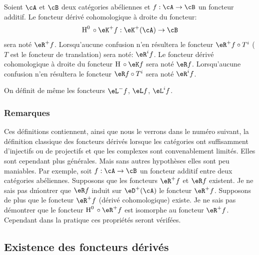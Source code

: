 Soient $\cA$ et $\cB$ deux catégories abéliennes et $f:\cA\to \cB$ un 
foncteur additif. Le foncteur dérivé cohomologique à droite du foncteur: 
\[
  \h^0{}\circ \eK^+ f:\eK^+(\cA) \to \cB 
\]
sera noté $\eR^+ f$. Lorsqu'aucune confusion n'en résultera le foncteur 
$\eR^+ f\circ T^i$ ($T$ est le foncteur de translation) sera noté: 
$\eR^i f$. Le foncteur dérivé cohomologique à droite du foncteur 
$\h{}\circ \eK f$ sera noté $\eR f$. Lorsqu'aucune confusion n'en résultera 
le foncteur $\eR f\circ T^i$ sera noté $\eR^i f$. 

On définit de même les foncteurs $\eL^- f$, $\eL f$, $\eL^i f$. 





\subsubsection{Remarques}\label{VIII:4-1-6}

Ces définitions contiennent, ainsi que nous le verrons dans le numéro 
suivant, la définition classique des foncteurs dérivés lorsque les 
catégories ont suffisamment d'injectifs ou de projectifs et que les complexes 
sont convenablement limités. Elles sont cependant plus générales. Mais 
sans autres hypothèses elles sont peu maniables. Par exemple, soit 
$f:\cA\to \cB$ un foncteur additif entre deux catégories abéliennes. 
Supposons que les foncteurs $\eR^+ f$ et $\eR f$ existent. Je ne sais pas 
d\'montrer que $\eR f$ induit sur $\eD^+(\cA)$ le foncteur $\eR^+ f$. Supposons 
de plus que le foncteur $\eR^+ f$ (dérivé cohomologique) existe. Je ne sais 
pas démontrer que le foncteur $\h^0{}\circ \eR^+ f$ est isomorphe au foncteur 
$\eR^+ f$. Cependant dans la pratique ces propriétés seront vérifées. 










\subsection{Existence des foncteurs dérivés}\label{VIII:4-2}





